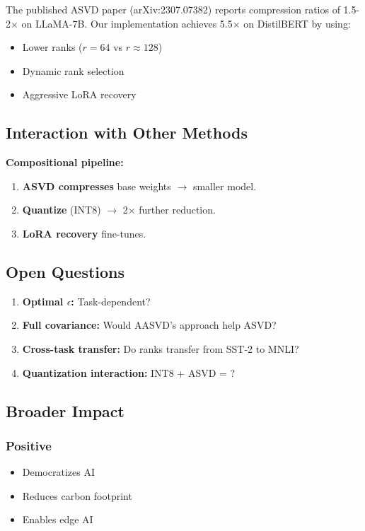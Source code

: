 The published ASVD paper (arXiv:2307.07382) reports compression ratios of 
1.5-2$\times$ on LLaMA-7B. Our implementation achieves 5.5$\times$ on DistilBERT 
by using:

\begin{itemize}
\item Lower ranks ($r = 64$ vs $r \approx 128$)
\item Dynamic rank selection
\item Aggressive LoRA recovery

\end{itemize}
\subsection{Interaction with Other Methods}

\textbf{Compositional pipeline:}

\begin{enumerate}
\item \textbf{ASVD compresses} base weights $\to$ smaller model.
\item \textbf{Quantize} (INT8) $\to$ 2$\times$ further reduction.
\item \textbf{LoRA recovery} fine-tunes.

\end{enumerate}
\subsection{Open Questions}

\begin{enumerate}
\item \textbf{Optimal $\epsilon$:} Task-dependent?
\item \textbf{Full covariance:} Would AASVD's approach help ASVD?
\item \textbf{Cross-task transfer:} Do ranks transfer from SST-2 to MNLI?
\item \textbf{Quantization interaction:} INT8 + ASVD = ?

\end{enumerate}
\subsection{Broader Impact}

\subsubsection{Positive}
\begin{itemize}
\item Democratizes AI
\item Reduces carbon footprint
\item Enables edge AI

\end{itemize}
